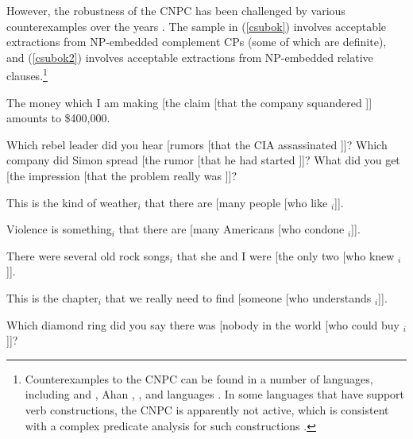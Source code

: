 \documentclass[output=paper
 	        ,biblatex
                ,babelshorthands
                ,newtxmath
                ,draftmode
                ,colorlinks, citecolor=brown
]{langscibook}
\begin{document}
However, the robustness of the CNPC  has been challenged by various
counterexamples over the years \citep{Ross67,pollardsag,kluender,postal98,saghof}.
The sample in (\ref{csubok}) involves acceptable
extractions from NP-embedded complement CPs (some of which are definite),
 and (\ref{csubok2}) involves acceptable extractions from NP-embedded relative clauses.\footnote{Counterexamples to  the CNPC can be found in a number of languages, 
including  and   \citep{kunojap,Nishigauchi99},  Ahan \citep{saah},    \citep[Chapter 2]{shir},   \citep{allwood,engdahl82}   \citep{taraldsen82} and  languages \citep{Cinque10}.  In some languages that have support verb constructions, the CNPC is apparently 
 not active, which is consistent with a complex predicate analysis 
 for such constructions \citet{vives}.}



\eal
 \label{csubok}
\ex The money which I am making [the claim [that the company squandered \spc]] amounts to \$400,000.\\
 \citep[206, 207]{pollardsag}

\ex  Which rebel leader did you hear [rumors [that the CIA assassinated \spc]]?
\ex Which company did Simon spread [the rumor [that he had started \spc]]?
\ex What did you get [the impression [that the problem really was \spc]]?\\
\citep{kluender}
\zl

\eal \label{csubok2}
\ex This is the kind of weather$_i$ that there are [many people [who like \spc$_i$]].\\
\citep{shirlappin}

\ex Violence is something$_i$ that there are [many Americans [who condone \spc$_i$]].\\
\citep[108]{mccawley81}

\ex There were several old rock songs$_i$ that she and I were [the only two [who
knew \spc$_i$]].\\
\citep{chungmc}

\ex This is the chapter$_i$ that we really need to find [someone [who understands \spc$_i$]].\\
\citep[238]{kluender92}

\ex Which diamond ring did you say there was [nobody in the world [who could
buy \spc$_i$]]?\\
\citep[206]{pollardsag}
\end{document}
